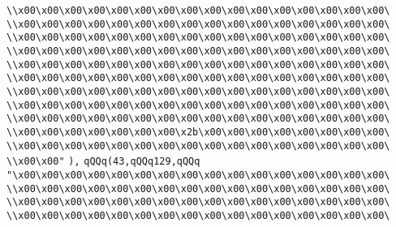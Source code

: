 \verb|\\x00\x00\x00\x00\x00\x00\x00\x00\x00\x00\x00\x00\x00\x00\x00\x00\|\newline
\verb|\\x00\x00\x00\x00\x00\x00\x00\x00\x00\x00\x00\x00\x00\x00\x00\x00\|\newline
\verb|\\x00\x00\x00\x00\x00\x00\x00\x00\x00\x00\x00\x00\x00\x00\x00\x00\|\newline
\verb|\\x00\x00\x00\x00\x00\x00\x00\x00\x00\x00\x00\x00\x00\x00\x00\x00\|\newline
\verb|\\x00\x00\x00\x00\x00\x00\x00\x00\x00\x00\x00\x00\x00\x00\x00\x00\|\newline
\verb|\\x00\x00\x00\x00\x00\x00\x00\x00\x00\x00\x00\x00\x00\x00\x00\x00\|\newline
\verb|\\x00\x00\x00\x00\x00\x00\x00\x00\x00\x00\x00\x00\x00\x00\x00\x00\|\newline
\verb|\\x00\x00\x00\x00\x00\x00\x00\x00\x00\x00\x00\x00\x00\x00\x00\x00\|\newline
\verb|\\x00\x00\x00\x00\x00\x00\x00\x00\x00\x00\x00\x00\x00\x00\x00\x00\|\newline
\verb|\\x00\x00\x00\x00\x00\x00\x00\x2b\x00\x00\x00\x00\x00\x00\x00\x00\|\newline
\verb|\\x00\x00\x00\x00\x00\x00\x00\x00\x00\x00\x00\x00\x00\x00\x00\x00\|\newline
\verb|\\x00\x00"|\newline
\verb|),|\newline
\verb|qQQq(43,qQQq129,qQQq|\newline
\verb|"\x00\x00\x00\x00\x00\x00\x00\x00\x00\x00\x00\x00\x00\x00\x00\x00\|\newline
\verb|\\x00\x00\x00\x00\x00\x00\x00\x00\x00\x00\x00\x00\x00\x00\x00\x00\|\newline
\verb|\\x00\x00\x00\x00\x00\x00\x00\x00\x00\x00\x00\x00\x00\x00\x00\x00\|\newline
\verb|\\x00\x00\x00\x00\x00\x00\x00\x00\x00\x00\x00\x00\x00\x00\x00\x00\|\newline
